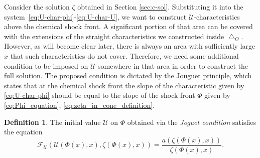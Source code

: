 \documentclass[12pt]{article}
\theoremstyle{definition}
\newtheorem{definition}{Definition}
\begin{document}
Consider the solution $\zeta$ obtained in Section \ref{sec:c-sol}.
Substituting it into the system~\eqref{eq:U-char-phi}-\eqref{eq:U-char-U}, we want to construct $\mathcal U$-characteristics 
above the chemical shock front. 
A significant portion of that area can be covered with the extensions of the straight characteristics we constructed inside $\bigtriangleup_O$. However, as will become clear later, there is always an area with sufficiently large $x$ that such characteristics do not cover.
Therefore, we need some additional condition to be imposed on $\mathcal U$ somewhere in that area in order to construct the full solution. The proposed condition is dictated by the Jouguet principle, which states that at the chemical shock front the slope of the characteristic given by \eqref{eq:U-char-phi} should be equal to the slope of the shock front $\Phi$ given by \eqref{eq:Phi_equation}, \eqref{eq:zeta_in_cone_definition}.
\begin{definition}
The initial value $\mathcal U$ on $\Phi$ obtained via the \emph{Joguet condition} satisfies the equation
\begin{equation}
\label{eq:Joguet_cond} 
\mathcal F_{\mathcal U}(\mathcal U(\Phi(x), x), \zeta(\Phi(x), x)) = \frac{a(\zeta(\Phi(x), x))}{\zeta(\Phi(x), x)}.
\end{equation} 
\end{definition}
\end{document}
